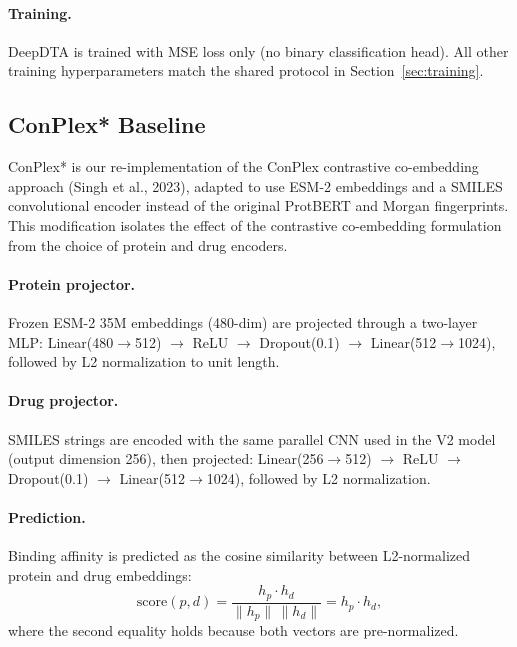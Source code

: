 \documentclass[11pt]{article}
\begin{document}
\paragraph{Training.}
DeepDTA is trained with MSE loss only (no binary classification head). All other training hyperparameters match the shared protocol in Section~\ref{sec:training}.

\subsection{ConPlex* Baseline}

ConPlex* is our re-implementation of the ConPlex contrastive co-embedding approach (Singh et al., 2023), adapted to use ESM-2 embeddings and a SMILES convolutional encoder instead of the original ProtBERT and Morgan fingerprints. This modification isolates the effect of the contrastive co-embedding formulation from the choice of protein and drug encoders.

\paragraph{Protein projector.}
Frozen ESM-2 35M embeddings (480-dim) are projected through a two-layer MLP: Linear(480$\to$512) $\to$ ReLU $\to$ Dropout(0.1) $\to$ Linear(512$\to$1024), followed by L2 normalization to unit length.

\paragraph{Drug projector.}
SMILES strings are encoded with the same parallel CNN used in the V2 model (output dimension 256), then projected: Linear(256$\to$512) $\to$ ReLU $\to$ Dropout(0.1) $\to$ Linear(512$\to$1024), followed by L2 normalization.

\paragraph{Prediction.}
Binding affinity is predicted as the cosine similarity between L2-normalized protein and drug embeddings:
\[
\mathrm{score}(p, d) = \frac{h_p \cdot h_d}{\|h_p\|\,\|h_d\|} = h_p \cdot h_d,
\]
where the second equality holds because both vectors are pre-normalized.
\end{document}
